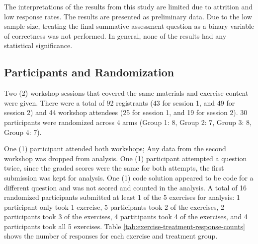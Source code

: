 \documentclass[040-assessment.tex]{subfiles}
\begin{document}
The interpretations of the results from this study are limited due to attrition and low response rates.
The results are presented as preliminary data.
Due to the low sample size, treating the final summative assessment question as a binary variable of
correctness was not performed.
In general, none of the results had any statistical significance.

\subsection{Participants and Randomization}

    Two (2) workshop sessions that covered the same materials and exercise content were given.
    There were a total of 92 registrants (43 for session 1, and 49 for session 2)
    and 44 workshop attendees (25 for session 1, and 19 for session 2).
    30 participants were randomized across 4 arms
    (Group 1: 8, Group 2: 7, Group 3: 8, Group 4: 7).

    One (1) participant attended both workshops;
    Any data from the second workshop was dropped from analysis.
    One (1) participant attempted a question twice,
    since the graded scores were the same for both attempts,
    the first submission was kept for analysis.
    One (1) code solution appeared to be code for a different question and was not scored and counted in the analysis.
    A total of 16 randomized participants submitted at least 1 of the 5 exercises for analysis:
    1 participant only took 1 exercise,
    5 participants took 2 of the exercises,
    2 participants took 3 of the exercises,
    4 partitipants took 4 of the exercises, and
    4 participants took all 5 exercises.
    Table \ref{tab:exercise-treatment-response-counts} shows the number of
    responses for each exercise and treatment group.
\end{document}
